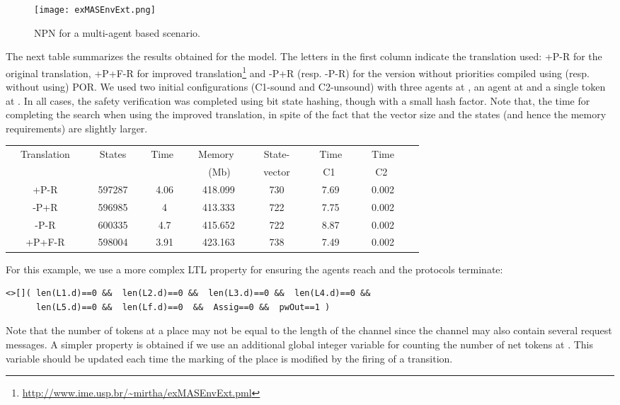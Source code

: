 \documentclass{llncs}
\begin{document}
\begin{figure}
\begin{center}
\texttt{[image: exMASEnvExt.png]}
\end{center}
\vspace{-10pt}
\caption{NPN for a multi-agent based scenario.}
\label{figEx2}
\end{figure}


The next table summarizes the results obtained for the model. The letters in the first column indicate the translation used: +P-R for the original translation, +P+F-R for improved translation\footnote{\small\url{http://www.ime.usp.br/~mirtha/exMASEnvExt.pml}\nfont} and -P+R (resp. -P-R) for the version without priorities compiled using (resp. without using) POR. We used two initial configurations (C1-sound and C2-unsound) with three agents at , an agent at  and a single token at . In all cases, the safety verification was completed using bit state hashing, though with a small hash factor. Note that, the time for completing the search  when using the improved translation, in spite of the fact that the vector size and the states (and hence the memory requirements) are slightly larger.



\vspace{10pt}
\begin{center}\begin{tabular}{|c|c|c|c|c|c|c|c|}
      \hline
      \ \ Translation\ \  &\ \ States\ \ &\ Time\ \ &\ Memory\ \ &\ \ State-\ \ &\ \ Time\ \ &\ \ Time\ \ \\
      \ \  \ \  &\ \  \ \ &\ \ \ &\ \ (Mb) \ &\ vector\ &\ \ C1 \ \ &\ \ C2 \ \ \\
      \hline
      +P-R  & 597287  & 4.06 & 418.099 &  730  &  7.69 & 0.002  \\
      \hline
      -P+R & 596985  & 4 &   413.333 & 722 &   7.75 & 0.002\\
      \hline
      -P-R & 600335  &  4.7 &   415.652 & 722 &   8.87 & 0.002 \\
      \hline
      +P+F-R  & 598004  & 3.91 & 423.163 & 738 & 7.49  & 0.002 \\
      \hline
\end{tabular}\end{center}
\vspace{10pt}


For this example, we use a more complex LTL property for ensuring the agents reach  and the protocols terminate:
\small
\begin{verbatim}
<>[]( len(L1.d)==0 &&  len(L2.d)==0 &&  len(L3.d)==0 &&  len(L4.d)==0 &&
      len(L5.d)==0 &&  len(Lf.d)==0  &&  Assig==0 &&  pwOut==1 )
\end{verbatim}
\nfont
\noindent Note that the number of tokens at a place may not be equal to the length of the channel since the channel may also contain several request messages. A simpler property is obtained if we use an additional global integer variable for counting the number of net tokens at . This variable should be updated each time the marking of the place is modified by the firing of a transition.
\end{document}
